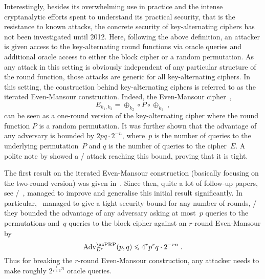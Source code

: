 Interestingly, besides its overwhelming use in practice and the intense cryptanalytic efforts spent to understand its practical security, that is the resistance to known attacks, the concrete security of key-alternating ciphers has not been investigated until 2012.
Here, following the above definition, an attacker is given access to the key-alternating round functions via oracle queries and additional oracle access to either the block cipher or a random permutation.
As any attack in this setting is obviously independent of any particular structure of the round function, those attacks are generic for all key-alternating ciphers.
In this setting, the construction behind key-alternating ciphers is referred to as the iterated Even-Mansour construction.
Indeed, the Even-Mansour cipher~\cite{JC:EveMan97},
\begin{equation*}
    E_{k_1,k_2} = \oplus_{k_2} \circ P \circ \oplus_{k_1}\;,
\end{equation*}
can be seen as a one-round version of the key-alternating cipher where the round function $P$ is a random permutation.
It was further shown that the advantage of any adversary is bounded by $2pq \cdot 2^{-n}$, where~$p$ is the number of queries to the underlying permutation~$P$ and $q$ is the number of queries to the cipher~$E$.
A polite note by \textcite{AC:Daemen91} showed a \CPA/ attack reaching this bound, proving that it is tight.

The first result on the iterated Even-Mansour construction (basically focusing on the two-round version) was given in~\cite{EC:BKLSST12}.
Since then, quite a lot of follow-up papers, see \eg/~, managed to improve and generalise this initial result significantly.
In particular,~\cite{C:HoaTes16} managed to give a tight security bound for any number of rounds, \ie/ they bounded the advantage of any adversary asking at most~$p$ queries to the permutations and~$q$ queries to the block cipher against an $r$-round Even-Mansour by
\begin{equation*}
    \mathrm{Adv}^{\text{\PRP/}}_{E^r}(p,q) \leqslant {4^rp^rq} \cdot {2^{-rn}}\;.
\end{equation*}
Thus for breaking the $r$-round Even-Mansour construction, any attacker needs to make roughly $2^{\frac{r}{r+1}n}$ oracle queries.


